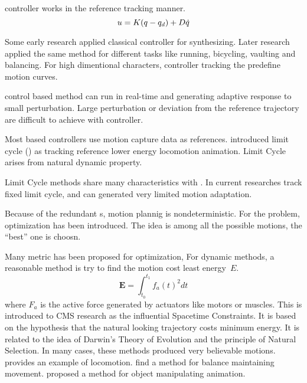 \begin{itemize}

\pd controller works in the reference tracking manner.
\begin{equation}
\label{eq:pdcontrol}
u=K(q -q_d)+D\dot{q}
\end{equation}

Some early research applied classical \pd controller \citep{Raibert1991} for synthesizing.
Later research \citep{Hodgins1995} applied the same method for different tasks like running, bicycling, vaulting and balancing. 
For high dimentional characters, \pd controller tracking the predefine motion curves\citep{Yin2007}.

\pd control based method can run in real-time and generating adaptive response to small perturbation.
Large perturbation or deviation from the reference trajectory are difficult to achieve with \pd controller.








Most \pd based controllers use motion capture data as references.
\citet{Laszlo1996} introduced limit cycle (\lc) as tracking reference lower energy locomotion animation. 
Limit Cycle arises from natural dynamic property.

Limit Cycle methods share many characteristics with \pd.
In current researches\citep{Coros2009,Laszlo1996} track fixed limit cycle, and can generated very limited motion adaptation.



 


Because of the redundant \dof s, motion plannig is nondeterministic.
For the problem, optimization has been introduced.
The idea is among all the possible motions, the ``best'' one is choosn.

Many metric has been proposed for optimization, 
For dynamic methods, a reasonable method is try to find the motion cost least energy~$E$. 
\begin{equation}
 \textbf{E}=\int_{t_0}^{t_1}f_{a}(t)^2dt
\end{equation}
where $F_{a}$ is the active force generated by actuators like motors or muscles. 
This is introduced to CMS research as the influential Spacetime Constraints\citep{Witkin1988}. 
It is based on the hypothesis that the natural looking trajectory costs minimum energy. 
It is related to the idea of Darwin's Theory of Evolution and the principle of Natural Selection. 
In many cases, these methods produced very believable motions. 
\citet{Jain2009} provides an example of locomotion.  
\citet{BalanceControl} find a method for balance maintaining movement. 
\citet{Liu2009} proposed a method for object manipulating animation. 
\end{itemize}

